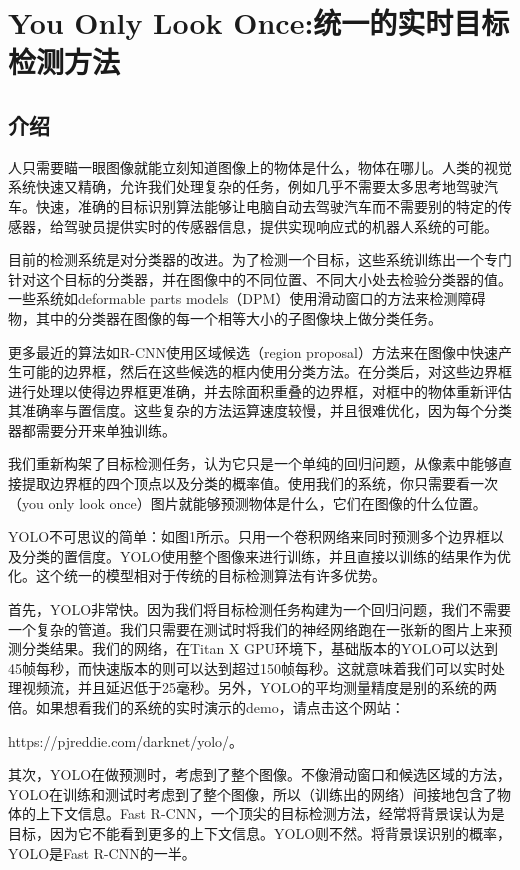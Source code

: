 
\chapter{You Only Look Once:统一的实时目标检测方法}

\section{介绍}

人只需要瞄一眼图像就能立刻知道图像上的物体是什么，物体在哪儿。人类的视觉系统快速又精确，允许我们处理复杂的任务，例如几乎不需要太多思考地驾驶汽车。快速，准确的目标识别算法能够让电脑自动去驾驶汽车而不需要别的特定的传感器，给驾驶员提供实时的传感器信息，提供实现响应式的机器人系统的可能。

目前的检测系统是对分类器的改进。为了检测一个目标，这些系统训练出一个专门针对这个目标的分类器，并在图像中的不同位置、不同大小处去检验分类器的值。一些系统如deformable parts models（DPM）使用滑动窗口的方法来检测障碍物，其中的分类器在图像的每一个相等大小的子图像块上做分类任务。

更多最近的算法如R-CNN使用区域候选（region proposal）方法来在图像中快速产生可能的边界框，然后在这些候选的框内使用分类方法。在分类后，对这些边界框进行处理以使得边界框更准确，并去除面积重叠的边界框，对框中的物体重新评估其准确率与置信度。这些复杂的方法运算速度较慢，并且很难优化，因为每个分类器都需要分开来单独训练。

我们重新构架了目标检测任务，认为它只是一个单纯的回归问题，从像素中能够直接提取边界框的四个顶点以及分类的概率值。使用我们的系统，你只需要看一次（you only look once）图片就能够预测物体是什么，它们在图像的什么位置。

YOLO不可思议的简单：如图1所示。只用一个卷积网络来同时预测多个边界框以及分类的置信度。YOLO使用整个图像来进行训练，并且直接以训练的结果作为优化。这个统一的模型相对于传统的目标检测算法有许多优势。

首先，YOLO非常快。因为我们将目标检测任务构建为一个回归问题，我们不需要一个复杂的管道。我们只需要在测试时将我们的神经网络跑在一张新的图片上来预测分类结果。我们的网络，在Titan X GPU环境下，基础版本的YOLO可以达到45帧每秒，而快速版本的则可以达到超过150帧每秒。这就意味着我们可以实时处理视频流，并且延迟低于25毫秒。另外，YOLO的平均测量精度是别的系统的两倍。如果想看我们的系统的实时演示的demo，请点击这个网站：

https://pjreddie.com/darknet/yolo/。

其次，YOLO在做预测时，考虑到了整个图像。不像滑动窗口和候选区域的方法，YOLO在训练和测试时考虑到了整个图像，所以（训练出的网络）间接地包含了物体的上下文信息。Fast R-CNN，一个顶尖的目标检测方法，经常将背景误认为是目标，因为它不能看到更多的上下文信息。YOLO则不然。将背景误识别的概率，YOLO是Fast R-CNN的一半。

